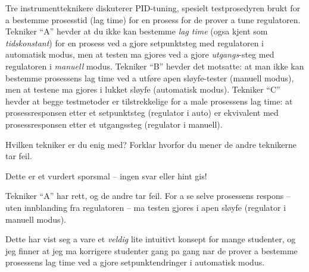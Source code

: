

Tre instrumentteknikere diskuterer PID-tuning, spesielt testprosedyren brukt for a bestemme prosesstid (lag time) for en prosess for de prover a tune regulatoren.  Tekniker ``A'' hevder at du ikke kan bestemme {\it lag time} (ogsa kjent som {\it tidskonstant}) for en prosess ved a gjore setpunktsteg med regulatoren i automatisk modus, men at testen ma gjores ved a gjore {\it utgangs}-steg med regulatoren i {\it manuell} modus.  Tekniker ``B'' hevder det motsatte: at man ikke kan bestemme prosessens lag time ved a utføre apen sløyfe-tester (manuell modus), men at testene ma gjores i lukket sløyfe (automatisk modus).  Tekniker ``C'' hevder at begge testmetoder er tilstrekkelige for a male prosessens lag time: at prosessresponsen etter et setpunktsteg (regulator i auto) er ekvivalent med prosessresponsen etter et utgangssteg (regulator i manuell).

\vskip 10pt

Hvilken tekniker er du enig med?  Forklar hvorfor du mener de andre teknikerne tar feil.

\vfil

\eject






Dette er et vurdert sporsmal -- ingen svar eller hint gis!







Tekniker ``A'' har rett, og de andre tar feil.  For a se selve prosessens respons -- uten innblanding fra regulatoren -- ma testen gjores i apen sløyfe (regulator i manuell modus).

Dette har vist seg a vare et {\it veldig} lite intuitivt konsept for mange studenter, og jeg finner at jeg ma korrigere studenter gang pa gang nar de prover a bestemme prosessens lag time ved a gjore setpunktendringer i automatisk modus.




